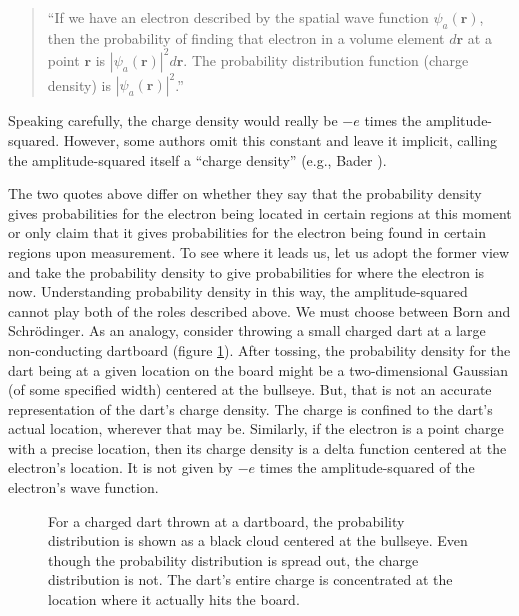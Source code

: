 \documentclass[12pt,onecolumn,secnumarabic,amsmath,amssymb,balancelastpage,nofootinbib]{article}
\begin{document}
\begin{quote}
``If we have an electron described by the spatial wave function $\psi_a(\bm{r})$, then the probability of finding that electron in a volume element $d\bm{r}$ at a point $\bm{r}$ is $|\psi_a(\bm{r})|^2 d\bm{r}$.  The probability distribution function (charge density) is $|\psi_a(\bm{r})|^2$.'' \cite[pg.\ 138]{szaboQC}
\end{quote}
Speaking carefully, the charge density would really be $-e$ times the amplitude-squared.  However, some authors omit this constant and leave it implicit, calling the amplitude-squared itself a ``charge density'' (e.g., Bader \cite{bader1990}).

The two quotes above differ on whether they say that the probability density gives probabilities for the electron being located in certain regions at this moment or only claim that it gives probabilities for the electron being found in certain regions upon measurement.  To see where it leads us, let us adopt the former view and take the probability density to give probabilities for where the electron is now.  Understanding probability density in this way, the amplitude-squared cannot play both of the roles described above.  We must choose between Born and Schr\"{o}dinger.  As an analogy, consider throwing a small charged dart at a large non-conducting dartboard (figure \ref{darts}).  After tossing, the probability density for the dart being at a given location on the board might be a two-dimensional Gaussian (of some specified width) centered at the  bullseye.  But, that is not an accurate representation of the dart's charge density.  The charge is confined to the dart's actual location, wherever that may be.  Similarly, if the electron is a point charge with a precise location, then its charge density is a delta function centered at the electron's location.  It is not given by $-e$ times the amplitude-squared of the electron's wave function.

\begin{figure}[htb]
\caption{For a charged dart thrown at a dartboard, the probability distribution is shown as a black cloud centered at the bullseye.  Even though the probability distribution is spread out, the charge distribution is not.  The dart's entire charge is concentrated at the location where it actually hits the board.}
\label{darts}
\end{figure}
\end{document}
